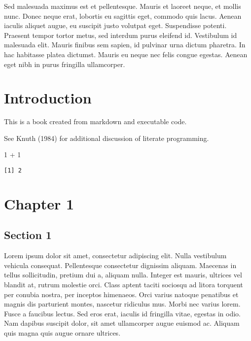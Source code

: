 \documentclass[
  12pt,
  letterpaper,
  oneside,
  open=any]{scrbook}
\newenvironment{Shaded}{\begin{snugshade}}{\end{snugshade}}
\newcommand{\DecValTok}[1]{\textcolor[rgb]{0.68,0.00,0.00}{#1}}
\newcommand{\SpecialCharTok}[1]{\textcolor[rgb]{0.37,0.37,0.37}{#1}}
\begin{document}
Sed malesuada maximus est et pellentesque. Mauris et laoreet neque, et
mollis nunc. Donec neque erat, lobortis eu sagittis eget, commodo quis
lacus. Aenean iaculis aliquet augue, eu suscipit justo volutpat eget.
Suspendisse potenti. Praesent tempor tortor metus, sed interdum purus
eleifend id. Vestibulum id malesuada elit. Mauris finibus sem sapien, id
pulvinar urna dictum pharetra. In hac habitasse platea dictumst. Mauris
eu neque nec felis congue egestas. Aenean eget nibh in purus fringilla
ullamcorper.

\tableofcontents
\listoftables
\listoffigures


\hypertarget{introduction}{%
\chapter{Introduction}\label{introduction}}



This is a book created from markdown and executable code.

See Knuth (1984) for additional discussion of literate programming.

\begin{Shaded}
\begin{Highlighting}[]
\DecValTok{1} \SpecialCharTok{+} \DecValTok{1}
\end{Highlighting}
\end{Shaded}

\begin{verbatim}
[1] 2
\end{verbatim}


\hypertarget{chapter-1}{%
\chapter{Chapter 1}\label{chapter-1}}

\hypertarget{section-1}{%
\section{Section 1}\label{section-1}}

Lorem ipsum dolor sit amet, consectetur adipiscing elit. Nulla
vestibulum vehicula consequat. Pellentesque consectetur dignissim
aliquam. Maecenas in tellus sollicitudin, pretium dui a, aliquam nulla.
Integer est mauris, ultrices vel blandit at, rutrum molestie orci. Class
aptent taciti sociosqu ad litora torquent per conubia nostra, per
inceptos himenaeos. Orci varius natoque penatibus et magnis dis
parturient montes, nascetur ridiculus mus. Morbi nec varius lorem. Fusce
a faucibus lectus. Sed eros erat, iaculis id fringilla vitae, egestas in
odio. Nam dapibus suscipit dolor, sit amet ullamcorper augue euismod ac.
Aliquam quis magna quis augue ornare ultrices.
\end{document}
